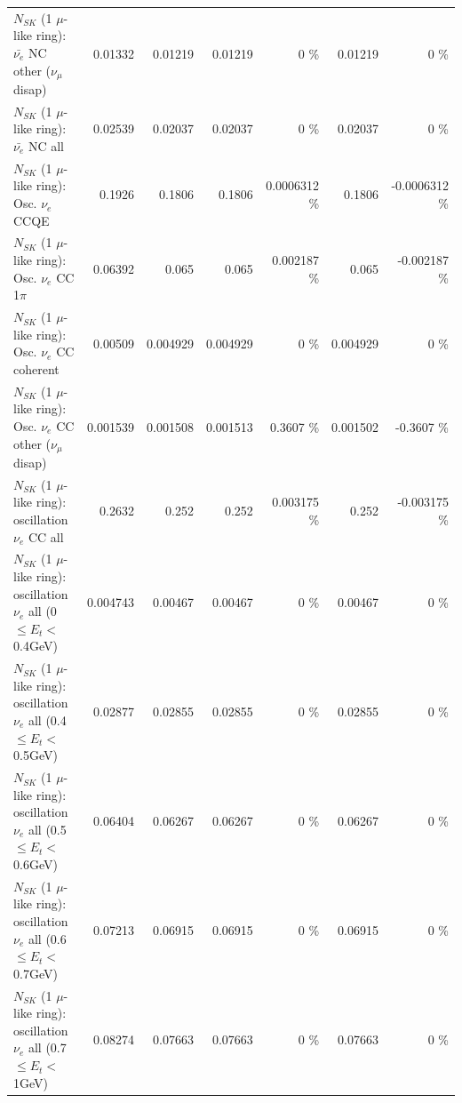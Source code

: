 \begin{table}
\begin{tabular}{| l | r | r | r  r | r  r |}
          $N_{SK}$ (1 $\mu$-like ring): $\bar{\nu_e}$ NC other ($\nu_\mu$ disap) &         0.01332 &         0.01219 &         0.01219 &        0 \%  &         0.01219 &        0 \%  \\ 
                            $N_{SK}$ (1 $\mu$-like ring): $\bar{\nu_{e}}$ NC all &         0.02539 &         0.02037 &         0.02037 &        0 \%  &         0.02037 &        0 \%  \\ 
\hline
\hline
\hline
                                 $N_{SK}$ (1 $\mu$-like ring): Osc. $\nu_e$ CCQE &          0.1926 &          0.1806 &          0.1806 & 0.0006312 \%  &          0.1806 & -0.0006312 \%  \\ 
                            $N_{SK}$ (1 $\mu$-like ring): Osc. $\nu_e$ CC 1$\pi$ &         0.06392 &           0.065 &           0.065 & 0.002187 \%  &           0.065 & -0.002187 \%  \\ 
                          $N_{SK}$ (1 $\mu$-like ring): Osc. $\nu_e$ CC coherent &         0.00509 &        0.004929 &        0.004929 &        0 \%  &        0.004929 &        0 \%  \\ 
           $N_{SK}$ (1 $\mu$-like ring): Osc. $\nu_e$ CC other ($\nu_\mu$ disap) &        0.001539 &        0.001508 &        0.001513 &   0.3607 \%  &        0.001502 &  -0.3607 \%  \\ 
                        $N_{SK}$ (1 $\mu$-like ring): oscillation $\nu_e$ CC all &          0.2632 &           0.252 &           0.252 & 0.003175 \%  &           0.252 & -0.003175 \%  \\ 
\hline
$N_{SK}$ (1 $\mu$-like ring): oscillation $\nu_{e}$ all (0 $\leq E_{t} <$ 0.4GeV) &        0.004743 &         0.00467 &         0.00467 &        0 \%  &         0.00467 &        0 \%  \\ 
$N_{SK}$ (1 $\mu$-like ring): oscillation $\nu_{e}$ all (0.4 $\leq E_{t} <$ 0.5GeV) &         0.02877 &         0.02855 &         0.02855 &        0 \%  &         0.02855 &        0 \%  \\ 
$N_{SK}$ (1 $\mu$-like ring): oscillation $\nu_{e}$ all (0.5 $\leq E_{t} <$ 0.6GeV) &         0.06404 &         0.06267 &         0.06267 &        0 \%  &         0.06267 &        0 \%  \\ 
$N_{SK}$ (1 $\mu$-like ring): oscillation $\nu_{e}$ all (0.6 $\leq E_{t} <$ 0.7GeV) &         0.07213 &         0.06915 &         0.06915 &        0 \%  &         0.06915 &        0 \%  \\ 
$N_{SK}$ (1 $\mu$-like ring): oscillation $\nu_{e}$ all (0.7 $\leq E_{t} <$ 1GeV) &         0.08274 &         0.07663 &         0.07663 &        0 \%  &         0.07663 &        0 \%  \\ 

\end{tabular}
\end{table}
